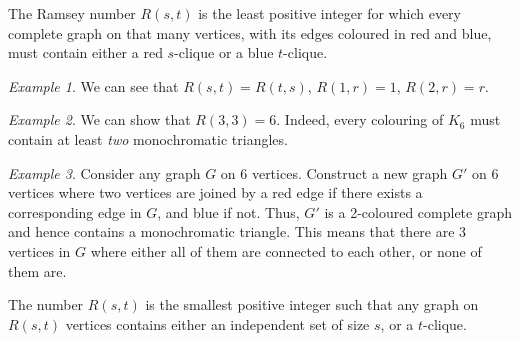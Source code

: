 \documentclass[11pt]{article}
\theoremstyle{definition}
\theoremstyle{remark}
\newtheorem*{example}{Example}
\numberwithin{equation}{section}
\begin{document}
    \begin{definition}
        The Ramsey number $R(s, t)$ is the least positive integer for which every
        complete graph on that many vertices, with its edges coloured in red and
        blue, must contain either a red $s$-clique or a blue $t$-clique.
    \end{definition}
    \begin{example}
        We can see that $R(s, t) = R(t, s)$, $R(1, r) = 1$, $R(2, r) = r$.
    \end{example}
    \begin{example}
        We can show that $R(3, 3) = 6$. Indeed, every colouring of $K_6$ must contain
        at least \emph{two} monochromatic triangles.
    \end{example}
    \begin{example}
        Consider any graph $G$ on $6$ vertices. Construct a new graph $G'$ on $6$
        vertices where two vertices are joined by a red edge if there exists a
        corresponding edge in $G$, and blue if not. Thus, $G'$ is a 2-coloured
        complete graph and hence contains a monochromatic triangle. This means that
        there are 3 vertices in $G$ where either all of them are connected to each
        other, or none of them are.
    \end{example}
    \begin{lemma}
        The number $R(s, t)$ is the smallest positive integer such that any graph on
        $R(s, t)$ vertices contains either an independent set of size $s$, or a
        $t$-clique.
    \end{lemma}
\end{document}
